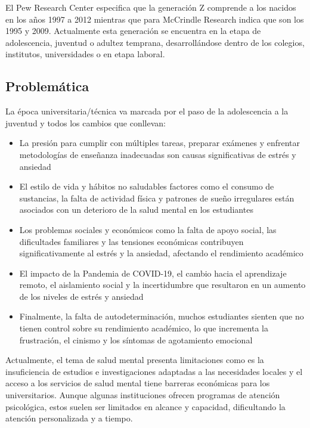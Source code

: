 \documentclass[conference]{IEEEtran}
\begin{document}
El Pew Research Center especifica que la generación Z comprende a los nacidos en los años 1997 a 2012 mientras que para McCrindle Research indica que son los 1995 y 2009. Actualmente esta generación se encuentra en la etapa de adolescencia, juventud o adultez temprana, desarrollándose dentro de los colegios, institutos, universidades o en etapa laboral.

\subsection{Problemática}
La época universitaria/técnica va marcada por el paso de la adolescencia a la juventud y todos los cambios que conllevan:

\begin{itemize}
\item La presión para cumplir con múltiples tareas, preparar exámenes y enfrentar metodologías de enseñanza inadecuadas son causas significativas de estrés y ansiedad \cite{b3}
\item El estilo de vida y hábitos no saludables factores como el consumo de sustancias, la falta de actividad física y patrones de sueño irregulares están asociados con un deterioro de la salud mental en los estudiantes \cite{b4}
\item Los problemas sociales y económicos como la falta de apoyo social, las dificultades familiares y las tensiones económicas contribuyen significativamente al estrés y la ansiedad, afectando el rendimiento académico \cite{b5}
\item El impacto de la Pandemia de COVID-19, el cambio hacia el aprendizaje remoto, el aislamiento social y la incertidumbre que resultaron en un aumento de los niveles de estrés y ansiedad \cite{b6}
\item Finalmente, la falta de autodeterminación, muchos estudiantes sienten que no tienen control sobre su rendimiento académico, lo que incrementa la frustración, el cinismo y los síntomas de agotamiento emocional \cite{b7}
\end{itemize}

Actualmente, el tema de salud mental presenta limitaciones como es la insuficiencia de estudios e investigaciones adaptadas a las necesidades locales y el acceso a los servicios de salud mental tiene barreras económicas para los universitarios. Aunque algunas instituciones ofrecen programas de atención psicológica, estos suelen ser limitados en alcance y capacidad, dificultando la atención personalizada y a tiempo.
\end{document}
